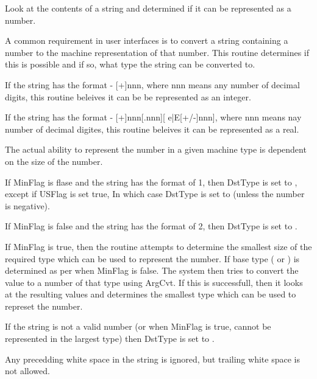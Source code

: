\begin{manroutinedescription}
	Look at the contents of a string
	and determined if it can be represented as a number.

	A common requirement in user interfaces is to convert a
	string containing a number to the machine representation of
	that number.  This routine determines if this is possible and
	if so, what type the string can be converted to.

\begin{manenumerate}
If the string has the format - [+{\mantt{-}}]nnn, where %
nnn means any
	number of decimal digits, this routine beleives it can be
	be represented as an integer.
\end{manenumerate}

\begin{manenumerate}
If the string has the format -  [+{\mantt{-}}]nnn[.nnn][{%
e|E}[+/-]nnn],
	where nnn means nay number of decimal digites, this routine
	beleives it can be represented as a real.
\end{manenumerate}

	The actual ability to represent the number in a given machine type
	is dependent on the size of the number.

	If MinFlag is flase and the string has the format of 1, then DstType
	is set to  {}, except if USFlag is set true, In which
	case DstType is set to {} (unless the number is negative).

	If MinFlag is false and the string has the format of 2, then
	DstType is set to {}.

	If MinFlag is true, then the routine attempts to determine the
	smallest size of the required type which can be used to represent
	the number.  If base type ({} or {}) is determined as %
per
	when MinFlag is false.  The system then tries to convert the
	value to a number of that type using ArgCvt.  If this is successfull,
	then it looks at the resulting values and determines the smallest
	type which can be used to represet the number.

	If the string is not a valid number (or when MinFlag is true, cannot be
	represented in the largest type) then DstType is set to {%
}.

	Any precedding white space in the string is ignored, but
	trailing white space is not allowed.


\end{manroutinedescription}
